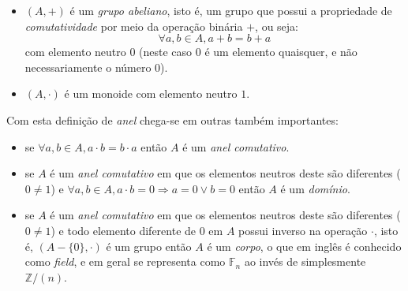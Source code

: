 \begin{itemize}
    \item $(A, +)$ é um \textit{grupo abeliano}, isto é, um grupo que possui a propriedade de \textit{comutatividade} por meio da operação binária $+$, ou seja:
    \begin{equation*}
        \forall a, b \in A, a + b = b + a
    \end{equation*}
    com elemento neutro $0$ (neste caso $0$ é um elemento quaisquer, e não necessariamente o número $0$).
    \item $(A, \cdot)$ é um monoide com elemento neutro $1$.
\end{itemize}
Com esta definição de \textit{anel} chega-se em outras também importantes:
\begin{itemize}
    \item se $\forall a, b \in A, a \cdot b = b \cdot a$ então $A$ é um \textit{anel comutativo}.

    \item se $A$ é um \textit{anel comutativo} em que os elementos neutros deste são diferentes ($0 \neq 1$) e $\forall a, b \in A, a \cdot b = 0 \Rightarrow a = 0 \lor b = 0$ então $A$ é um \textit{domínio}.

    \item se $A$ é um \textit{anel comutativo} em que os elementos neutros deste são diferentes ($0 \neq 1$) e todo elemento diferente de $0$ em $A$ possui inverso na operação $\cdot$, isto é, $(A - \{0\}, \cdot)$ é um grupo então $A$ é um \textit{corpo}, o que em inglês é conhecido como \textit{field}, e em geral se representa como $\mathbb{F}_n$ ao invés de simplesmente $\mathbb{Z}/(n)$.
\end{itemize}

